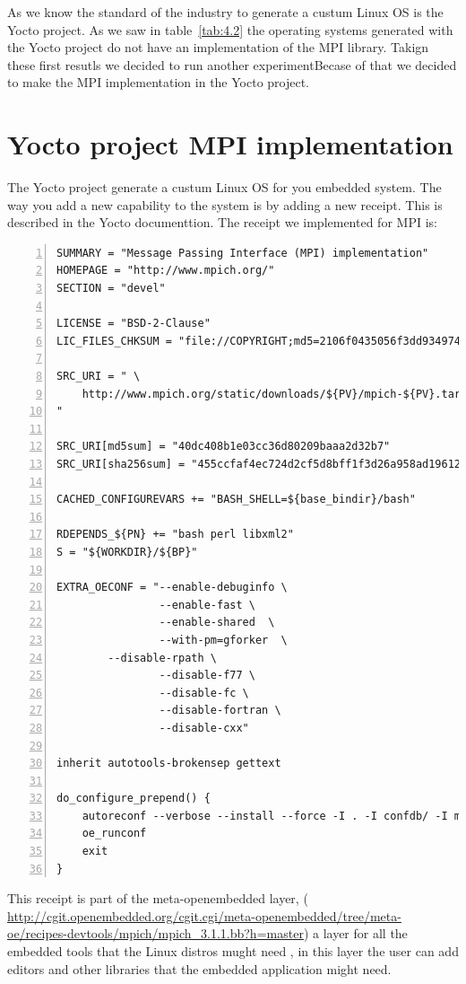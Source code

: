 As we know the standard of the industry to generate a custum Linux OS is the
Yocto project. As we saw in table~\ref{tab:4.2} the operating systems generated
with the Yocto project do not have an implementation of the MPI library. Takign
these first resutls we decided to run another experimentBecase
of that we decided to make the MPI implementation in the Yocto project. 


\section{Yocto project MPI implementation}

The Yocto project \cite{yocto-project} generate a custum Linux OS for you
embedded system. The way you add a new capability to the system is by adding a
new receipt. This is described in the Yocto documenttion. The receipt we
implemented for MPI is: 

\begin{lstlisting}[frame=single,numbers=left,breaklines=true]
SUMMARY = "Message Passing Interface (MPI) implementation"
HOMEPAGE = "http://www.mpich.org/"
SECTION = "devel"

LICENSE = "BSD-2-Clause"
LIC_FILES_CHKSUM = "file://COPYRIGHT;md5=2106f0435056f3dd9349747a766e5816"

SRC_URI = " \
	http://www.mpich.org/static/downloads/${PV}/mpich-${PV}.tar.gz \
"

SRC_URI[md5sum] = "40dc408b1e03cc36d80209baaa2d32b7"
SRC_URI[sha256sum] = "455ccfaf4ec724d2cf5d8bff1f3d26a958ad196121e7ea26504fd3018757652d"

CACHED_CONFIGUREVARS += "BASH_SHELL=${base_bindir}/bash"

RDEPENDS_${PN} += "bash perl libxml2"
S = "${WORKDIR}/${BP}"

EXTRA_OECONF = "--enable-debuginfo \
                --enable-fast \
                --enable-shared  \
                --with-pm=gforker  \
		--disable-rpath \
                --disable-f77 \
                --disable-fc \
                --disable-fortran \
                --disable-cxx"

inherit autotools-brokensep gettext

do_configure_prepend() {
    autoreconf --verbose --install --force -I . -I confdb/ -I maint/
    oe_runconf
    exit
}

\end{lstlisting}

This receipt is part of the meta-openembedded layer, (
\url{http://cgit.openembedded.org/cgit.cgi/meta-openembedded/tree/meta-oe/recipes-devtools/mpich/mpich_3.1.1.bb?h=master})
a layer for all the embedded tools that the Linux distros mught need , in this
layer the user can add editors and other libraries that the embedded
application might need. 

